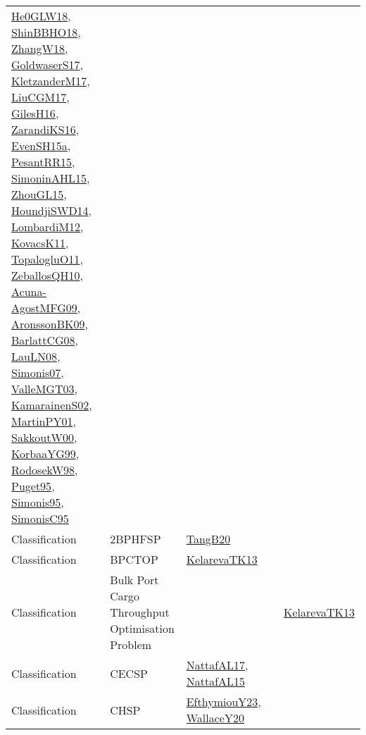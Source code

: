 {\begin{longtable}{lp{3cm}>{\raggedright}p{6cm}>{\raggedright}p{6cm}p{8cm}}
\href{papers/He0GLW18.pdf}{He0GLW18}\cite{He0GLW18}, \href{articles/ShinBBHO18.pdf}{ShinBBHO18}\cite{ShinBBHO18}, \href{articles/ZhangW18.pdf}{ZhangW18}\cite{ZhangW18}, \href{papers/GoldwaserS17.pdf}{GoldwaserS17}\cite{GoldwaserS17}, \href{papers/KletzanderM17.pdf}{KletzanderM17}\cite{KletzanderM17}, \href{papers/LiuCGM17.pdf}{LiuCGM17}\cite{LiuCGM17}, \href{papers/GilesH16.pdf}{GilesH16}\cite{GilesH16}, \href{articles/ZarandiKS16.pdf}{ZarandiKS16}\cite{ZarandiKS16}, \href{articles/EvenSH15a.pdf}{EvenSH15a}\cite{EvenSH15a}, \href{papers/PesantRR15.pdf}{PesantRR15}\cite{PesantRR15}, \href{articles/SimoninAHL15.pdf}{SimoninAHL15}\cite{SimoninAHL15}, \href{papers/ZhouGL15.pdf}{ZhouGL15}\cite{ZhouGL15}, \href{papers/HoundjiSWD14.pdf}{HoundjiSWD14}\cite{HoundjiSWD14}, \href{articles/LombardiM12.pdf}{LombardiM12}\cite{LombardiM12}, \href{articles/KovacsK11.pdf}{KovacsK11}\cite{KovacsK11}, \href{articles/TopalogluO11.pdf}{TopalogluO11}\cite{TopalogluO11}, \href{articles/ZeballosQH10.pdf}{ZeballosQH10}\cite{ZeballosQH10}, \href{papers/Acuna-AgostMFG09.pdf}{Acuna-AgostMFG09}\cite{Acuna-AgostMFG09}, \href{papers/AronssonBK09.pdf}{AronssonBK09}\cite{AronssonBK09}, \href{papers/BarlattCG08.pdf}{BarlattCG08}\cite{BarlattCG08}, \href{papers/LauLN08.pdf}{LauLN08}\cite{LauLN08}, \href{articles/Simonis07.pdf}{Simonis07}\cite{Simonis07}, \href{papers/ValleMGT03.pdf}{ValleMGT03}\cite{ValleMGT03}, \href{papers/KamarainenS02.pdf}{KamarainenS02}\cite{KamarainenS02}, \href{articles/MartinPY01.pdf}{MartinPY01}\cite{MartinPY01}, \href{articles/SakkoutW00.pdf}{SakkoutW00}\cite{SakkoutW00}, \href{papers/KorbaaYG99.pdf}{KorbaaYG99}\cite{KorbaaYG99}, \href{papers/RodosekW98.pdf}{RodosekW98}\cite{RodosekW98}, \href{papers/Puget95.pdf}{Puget95}\cite{Puget95}, \href{papers/Simonis95.pdf}{Simonis95}\cite{Simonis95}, \href{papers/SimonisC95.pdf}{SimonisC95}\cite{SimonisC95}\\
Classification & 2BPHFSP & \href{papers/TangB20.pdf}{TangB20}\cite{TangB20} &  & \\
Classification & BPCTOP & \href{papers/KelarevaTK13.pdf}{KelarevaTK13}\cite{KelarevaTK13} &  & \\
Classification & Bulk Port Cargo Throughput Optimisation Problem &  &  & \href{papers/KelarevaTK13.pdf}{KelarevaTK13}\cite{KelarevaTK13}\\
Classification & CECSP & \href{articles/NattafAL17.pdf}{NattafAL17}\cite{NattafAL17}, \href{articles/NattafAL15.pdf}{NattafAL15}\cite{NattafAL15} &  & \\
Classification & CHSP & \href{papers/EfthymiouY23.pdf}{EfthymiouY23}\cite{EfthymiouY23}, \href{articles/WallaceY20.pdf}{WallaceY20}\cite{WallaceY20} &  & \\

\end{longtable}}
